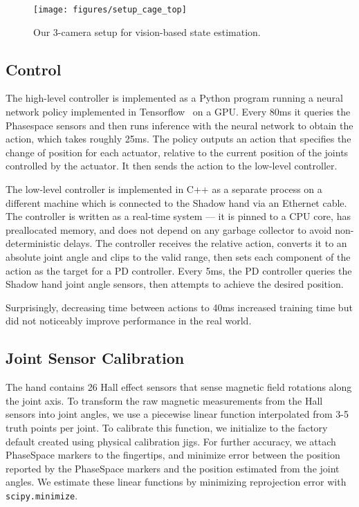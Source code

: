 \begin{figure}[t]
    \centering
    \texttt{[image: figures/setup\_cage\_top]}
    \caption{Our 3-camera setup for vision-based state estimation.}
    \label{fig:camera-setup}
\end{figure}

\subsection{Control}

The high-level controller is implemented as a Python program
running a neural network policy implemented in Tensorflow~\citep{tensorflow}
on a GPU. Every 80ms it queries the Phasespace sensors and then runs inference with the neural network to obtain the action, which takes roughly 25ms. The policy outputs an action that specifies the change of position for each actuator, relative to the current position of the joints controlled by the actuator. It then sends the action to the low-level controller.

The low-level controller is implemented in C++ as a separate process on a different machine which is 
connected to the Shadow hand via an Ethernet cable. The controller is written as a real-time system 
--- it is pinned to a CPU core, has preallocated memory, and does not depend on any garbage collector to avoid non-deterministic delays.
The controller receives the relative action, converts it to 
an absolute joint angle and clips to the valid range, then sets each component of the action as the target for a PD controller. Every 5ms, the PD controller queries the Shadow hand joint angle sensors, then attempts to achieve the desired position.


Surprisingly, decreasing time between actions to 40ms increased training time but did not noticeably improve performance in the real world.
















\subsection{Joint Sensor Calibration} 
\label{app:sensor-calibration}
The hand contains 26 Hall effect sensors that sense magnetic field rotations along the joint axis.
To transform the raw magnetic measurements from the Hall sensors into joint angles, we use a piecewise linear function interpolated from 3-5 truth points per joint. To calibrate this function, we initialize to the factory default created using physical calibration jigs. For further accuracy, we attach PhaseSpace markers to the fingertips, and minimize error between the position reported by the PhaseSpace markers and the position estimated from the joint angles.
We estimate these linear functions by minimizing reprojection error with \texttt{scipy.minimize}.